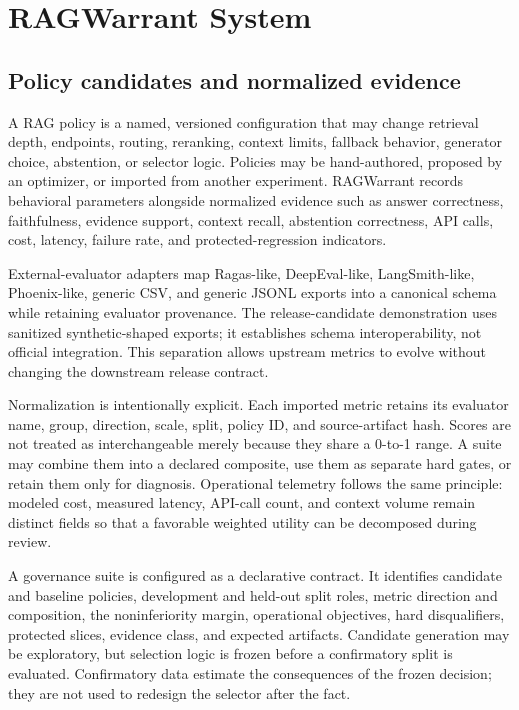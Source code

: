 \documentclass[11pt]{article}
\begin{document}
\section{RAGWarrant System}\label{sec:system}

\subsection{Policy candidates and normalized evidence}\label{sec:normalized-evidence}

A RAG policy is a named, versioned configuration that may change
retrieval depth, endpoints, routing, reranking, context limits, fallback
behavior, generator choice, abstention, or selector logic. Policies may
be hand-authored, proposed by an optimizer, or imported from another
experiment. RAGWarrant records behavioral parameters alongside
normalized evidence such as answer correctness, faithfulness, evidence
support, context recall, abstention correctness, API calls, cost,
latency, failure rate, and protected-regression indicators.

External-evaluator adapters map Ragas-like, DeepEval-like,
LangSmith-like, Phoenix-like, generic CSV, and generic JSONL exports
into a canonical schema while retaining evaluator provenance. The
release-candidate demonstration uses sanitized synthetic-shaped exports;
it establishes schema interoperability, not official integration. This
separation allows upstream metrics to evolve without changing the
downstream release contract.

Normalization is intentionally explicit. Each imported metric retains
its evaluator name, group, direction, scale, split, policy ID, and
source-artifact hash. Scores are not treated as interchangeable merely
because they share a 0-to-1 range. A suite may combine them into a
declared composite, use them as separate hard gates, or retain them only
for diagnosis. Operational telemetry follows the same principle: modeled
cost, measured latency, API-call count, and context volume remain
distinct fields so that a favorable weighted utility can be decomposed
during review.

A governance suite is configured as a declarative contract. It
identifies candidate and baseline policies, development and held-out
split roles, metric direction and composition, the noninferiority
margin, operational objectives, hard disqualifiers, protected slices,
evidence class, and expected artifacts. Candidate generation may be
exploratory, but selection logic is frozen before a confirmatory split
is evaluated. Confirmatory data estimate the consequences of the frozen
decision; they are not used to redesign the selector after the fact.
\end{document}
